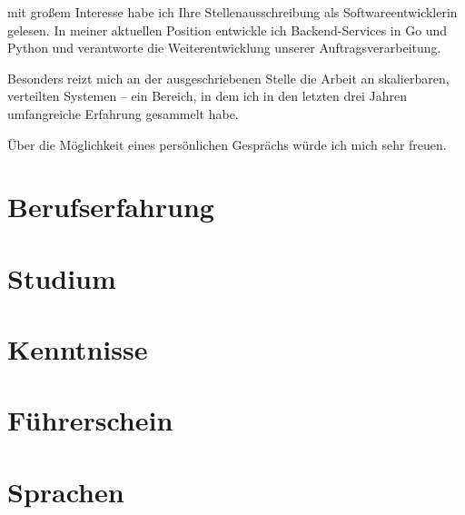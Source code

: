 \documentclass[%
	lebenslaufColor=light-gray,
	idPlain
]{bewerbung}
\begin{document}
	\begin{anschreiben}
		mit gro{\ss}em Interesse habe ich Ihre Stellenausschreibung als
		Softwareentwicklerin gelesen. In meiner aktuellen Position
		entwickle ich Backend-Services in Go und Python und verantworte
		die Weiterentwicklung unserer Auftragsverarbeitung.

		Besonders reizt mich an der ausgeschriebenen Stelle die
		Arbeit an skalierbaren, verteilten Systemen -- ein Bereich,
		in dem ich in den letzten drei Jahren umfangreiche Erfahrung
		gesammelt habe.

		{\"U}ber die M{\"o}glichkeit eines pers{\"o}nlichen
		Gespr{\"a}chs w{\"u}rde ich mich sehr freuen.
	\end{anschreiben}

	\begin{lebenslauf}[none][]
		\maketitle
		\makePerson

		\section{Berufserfahrung}

		\section{Studium}

		\section{Kenntnisse}

		\section{F\"uhrerschein}

		\section{Sprachen}
	\end{lebenslauf}
\end{document}
